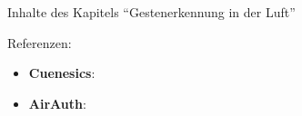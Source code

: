 Inhalte des Kapitels \enquote{Gestenerkennung in der Luft}

\noindent Referenzen:
\begin{itemize}
\item \textbf{Cuenesics}: \cite{Walter.2015}
\item \textbf{AirAuth}: \cite{Aumi.2015}
\end{itemize}